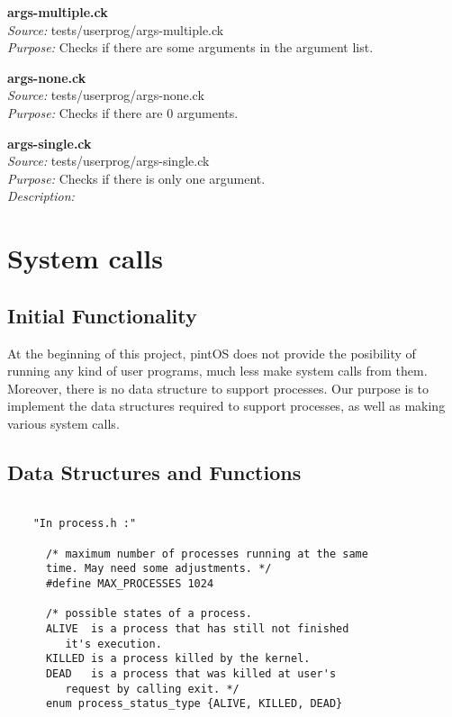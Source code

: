 {    \textbf{args-multiple.ck} \\
    \textit{Source:} tests/userprog/args-multiple.ck\\
    \textit{Purpose:} Checks if there are some arguments in 
	  the argument list.

    \textbf{args-none.ck}\\
    \textit{Source:} tests/userprog/args-none.ck\\
    \textit{Purpose:} Checks if there are 0 arguments.

    \textbf{args-single.ck}\\
    \textit{Source:} tests/userprog/args-single.ck\\
    \textit{Purpose:} Checks if there is only one argument.\\
    \textit{Description:}
    
\section{System calls}

    \subsection{Initial Functionality}

	At the beginning of this project, pintOS does not provide the posibility of running any kind of user programs, much less make system calls from them. Moreover, there is no data structure to support processes. Our purpose is to implement the data structures required to support processes, as well as making various system calls.

    \subsection{Data Structures and Functions}

    \begin{lstlisting}

    "In process.h :"
      
      /* maximum number of processes running at the same 
      time. May need some adjustments. */
      #define MAX_PROCESSES 1024

      /* possible states of a process. 
	  ALIVE  is a process that has still not finished 
		 it's execution. 
	  KILLED is a process killed by the kernel.
	  DEAD 	 is a process that was killed at user's 
		 request by calling exit. */
      enum process_status_type {ALIVE, KILLED, DEAD}


\end{lstlisting}}
